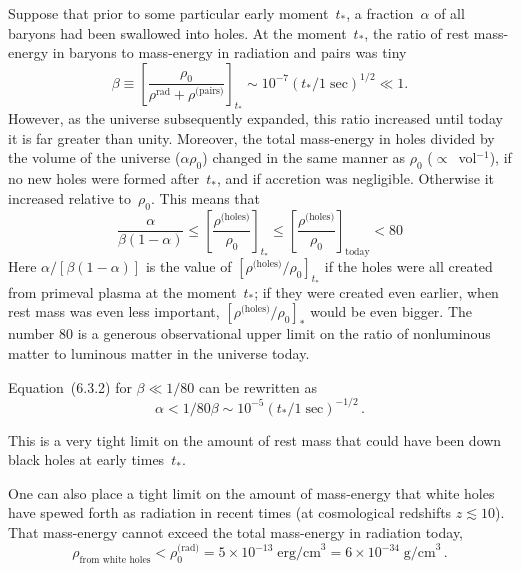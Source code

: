 Suppose that prior to some particular early moment~$t_*$, a fraction~$\alpha$ of all
baryons had been swallowed into holes.  At the moment~$t_*$, the ratio of rest mass-energy in baryons to mass-energy in radiation and pairs was tiny
%
\begin{equation}
\tag{6.3.1}
\beta \equiv \left[\frac{\rho_0}{\rho^{\text{rad}} + \rho^{\text{(pairs)}}}\right]_{t_*}
\sim 10^{-7} (t_*/1\;\text{sec})^{1/2} \ll 1.
\end{equation}
%
However, as the universe subsequently expanded, this ratio increased until today
it is far greater than unity.  Moreover, the total mass-energy in holes divided by
the volume of the universe ($\alpha \rho_0$) changed in the same manner as
$\rho_0$ ($\propto$~vol$^{-1}$), if no new holes were formed after~$t_*$, and if accretion was negligible.
Otherwise it increased relative to~$\rho_0$.  This means that
%
\begin{equation}
\tag{6.3.2}
\frac{\alpha}{\beta(1-\alpha)}
\leq \left[\frac{\rho^{\text{(holes)}}}{\rho_0}\right]_{t_*}
\leq \left[\frac{\rho^{\text{(holes)}}}{\rho_0}\right]_{\text{today}}
< 80
\end{equation}
%
Here $\alpha/[\beta(1-\alpha)]$ is the value of $[\rho^{\text{(holes)}}/\rho_0]_{t_*}$ if the holes were all created from
primeval plasma at the moment~$t_*$; if they were created even earlier, when rest
mass was even less important, $[\rho^{\text{(holes)}}/\rho_0]_*$ would be even bigger.  The number
80 is a generous observational upper limit on the ratio of nonluminous matter
to luminous matter in the universe today.

Equation~(6.3.2) for $\beta \ll 1/80$ can be rewritten as
%
\begin{equation}
\tag{6.3.3}
\alpha < 1/80\beta \sim 10^{-5} (t_*/1\;\text{sec})^{-1/2}\,.
\end{equation}

This is a very tight limit on the amount of rest mass that could have been down
black holes at early times~$t_*$.

One can also place a tight limit on the amount of mass-energy that white holes
have spewed forth as radiation in recent times (at cosmological redshifts $z \lesssim 10$).
That mass-energy cannot exceed the total mass-energy in radiation today,
%
\begin{equation}
\tag{6.3.4}
\rho_{\text{from white holes}} < \rho_0^{\text{(rad)}}
= 5 \times 10^{-13}\;\text{erg/cm}^3
= 6 \times 10^{-34}\;\text{g/cm}^3\,.
\end{equation}

